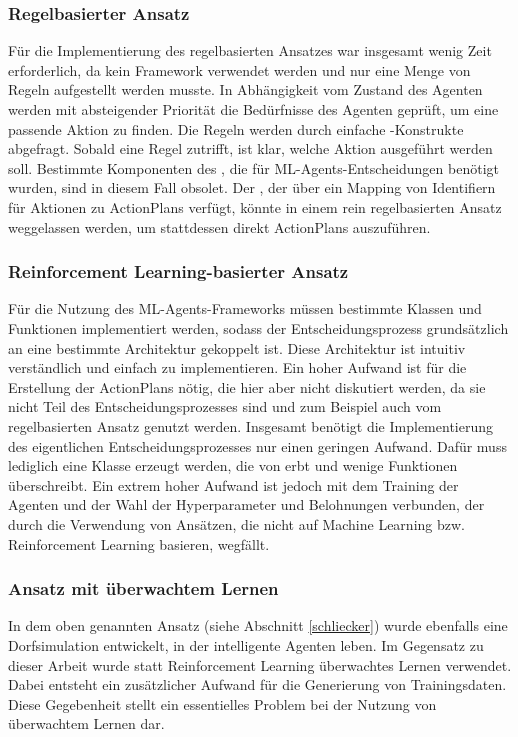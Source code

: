 



\subsubsection{Regelbasierter Ansatz}
Für die Implementierung des regelbasierten Ansatzes war insgesamt wenig Zeit erforderlich, da kein Framework verwendet werden und nur eine Menge von Regeln aufgestellt werden musste. In Abhängigkeit vom Zustand des Agenten werden mit absteigender Priorität die Bedürfnisse des Agenten geprüft, um eine passende Aktion zu finden.
Die Regeln werden durch einfache -Konstrukte abgefragt. Sobald eine Regel zutrifft, ist klar, welche Aktion ausgeführt werden soll. Bestimmte Komponenten des , die für ML-Agents-Entscheidungen benötigt wurden, sind in diesem Fall obsolet. Der , der über ein Mapping von Identifiern für Aktionen zu ActionPlans verfügt, könnte in einem rein regelbasierten Ansatz weggelassen werden, um stattdessen direkt ActionPlans auszuführen.


\subsubsection{Reinforcement Learning-basierter Ansatz}
Für die Nutzung des ML-Agents-Frameworks müssen bestimmte Klassen und Funktionen implementiert werden, sodass der Entscheidungsprozess grundsätzlich an eine bestimmte Architektur gekoppelt ist. Diese Architektur ist intuitiv verständlich und einfach zu implementieren.
Ein hoher Aufwand ist für die Erstellung der ActionPlans nötig, die hier aber nicht diskutiert werden, da sie nicht Teil des Entscheidungsprozesses sind und zum Beispiel auch vom regelbasierten Ansatz genutzt werden. Insgesamt benötigt die Implementierung des eigentlichen Entscheidungsprozesses nur einen geringen Aufwand. Dafür muss lediglich eine Klasse erzeugt werden, die von  erbt und wenige Funktionen überschreibt.
Ein extrem hoher Aufwand ist jedoch mit dem Training der Agenten und der Wahl der Hyperparameter und Belohnungen verbunden, der durch die Verwendung von Ansätzen, die nicht auf Machine Learning bzw. Reinforcement Learning basieren, wegfällt.

\subsubsection{Ansatz mit überwachtem Lernen}
In dem oben genannten Ansatz (siehe Abschnitt \ref{schliecker}) wurde ebenfalls eine Dorfsimulation entwickelt, in der intelligente Agenten leben. Im Gegensatz zu dieser Arbeit wurde statt Reinforcement Learning überwachtes Lernen verwendet. Dabei entsteht ein zusätzlicher Aufwand für die Generierung von Trainingsdaten. Diese Gegebenheit stellt ein essentielles Problem bei der Nutzung von überwachtem Lernen dar.




